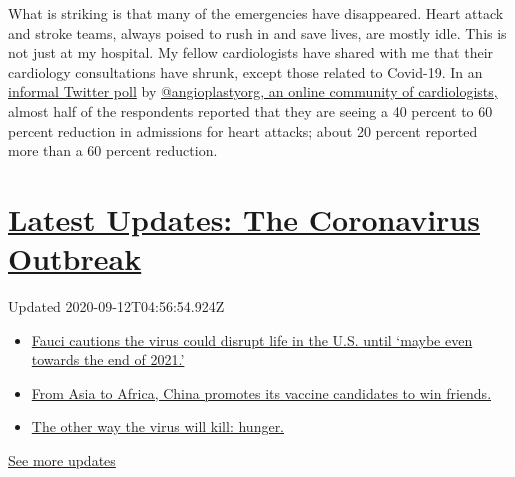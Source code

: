 What is striking is that many of the emergencies have disappeared. Heart
attack and stroke teams, always poised to rush in and save lives, are
mostly idle. This is not just at my hospital. My fellow cardiologists
have shared with me that their cardiology consultations have shrunk,
except those related to Covid-19. In an
\href{https://twitter.com/angioplastyorg/status/1245892249101074432?s=20}{informal
Twitter poll} by \href{http://angioplasty.org/}{@angioplastyorg, an
online community of cardiologists,} almost half of the respondents
reported that they are seeing a 40 percent to 60 percent reduction in
admissions for heart attacks; about 20 percent reported more than a 60
percent reduction.

\hypertarget{latest-updates-the-coronavirus-outbreak}{%
\section{\texorpdfstring{\href{https://www.nytimes3xbfgragh.onion/2020/09/11/world/covid-19-coronavirus.html?action=click\&pgtype=Article\&state=default\&region=MAIN_CONTENT_1\&context=storylines_live_updates}{Latest
Updates: The Coronavirus
Outbreak}}{Latest Updates: The Coronavirus Outbreak}}\label{latest-updates-the-coronavirus-outbreak}}

Updated 2020-09-12T04:56:54.924Z

\begin{itemize}
\tightlist
\item
  \href{https://www.nytimes3xbfgragh.onion/2020/09/11/world/covid-19-coronavirus.html?action=click\&pgtype=Article\&state=default\&region=MAIN_CONTENT_1\&context=storylines_live_updates\#link-dfb8a16}{Fauci
  cautions the virus could disrupt life in the U.S. until `maybe even
  towards the end of 2021.'}
\item
  \href{https://www.nytimes3xbfgragh.onion/2020/09/11/world/covid-19-coronavirus.html?action=click\&pgtype=Article\&state=default\&region=MAIN_CONTENT_1\&context=storylines_live_updates\#link-7104d154}{From
  Asia to Africa, China promotes its vaccine candidates to win friends.}
\item
  \href{https://www.nytimes3xbfgragh.onion/2020/09/11/world/covid-19-coronavirus.html?action=click\&pgtype=Article\&state=default\&region=MAIN_CONTENT_1\&context=storylines_live_updates\#link-393ad215}{The
  other way the virus will kill: hunger.}
\end{itemize}

\href{https://www.nytimes3xbfgragh.onion/2020/09/11/world/covid-19-coronavirus.html?action=click\&pgtype=Article\&state=default\&region=MAIN_CONTENT_1\&context=storylines_live_updates}{See
more updates}

